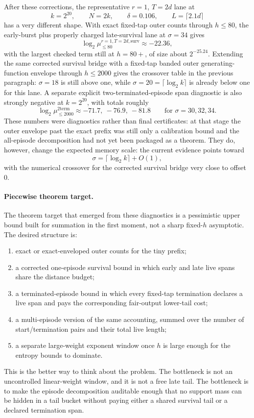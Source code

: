 After these corrections, the representative \(r=1\), \(T=2d\) lane at
\[
k=2^{20},\qquad N=2k,\qquad \delta=0.106,\qquad L=\lceil2.1d\rceil
\]
has a very different shape.  With exact fixed-tap outer counts through \(h\le80\), the early-burst plus properly
charged late-survival lane at \(\sigma=34\) gives
\[
\log_2 \mu_{\le80}^{r=1,T=2d,\mathrm{surv}}\approx -22.36,
\]
with the largest checked term still at \(h=80+\), of size about \(2^{-25.24}\).  Extending the same corrected survival
bridge with a fixed-tap banded outer generating-function envelope through \(h\le2000\) gives the crossover table in the
previous paragraph: \(\sigma=18\) is still above one, while \(\sigma=20=\lceil\log_2 k\rceil\) is already below one for
this lane.  A separate explicit two-terminated-episode span diagnostic is also strongly negative at
\(k=2^{20}\), with totals roughly
\[
\log_2\mu^{\mathrm{2term}}_{\le2000}
\approx -71.7,\ -76.9,\ -81.8
\qquad
\text{for }\sigma=30,32,34.
\]
These numbers were diagnostics rather than final certificates: at that stage the outer envelope past the exact prefix
was still only a calibration bound and the all-episode decomposition had not yet been packaged as a theorem.  They do,
however, change the expected memory scale: the current evidence points toward
\[
\sigma=\lceil\log_2 k\rceil+O(1),
\]
with the numerical crossover for the corrected survival bridge very close to offset \(0\).

\paragraph{Piecewise theorem target.}
The theorem target that emerged from these diagnostics is a pessimistic upper bound built for summation in the first
moment, not a sharp fixed-\(h\) asymptotic.  The desired structure is:
\begin{enumerate}
\item exact or exact-enveloped outer counts for the tiny prefix;
\item a corrected one-episode survival bound in which early and late live spans share the distance budget;
\item a terminated-episode bound in which every fixed-tap termination declares a live span and pays the corresponding
fair-output lower-tail cost;
\item a multi-episode version of the same accounting, summed over the number of start/termination pairs and their
total live length;
\item a separate large-weight exponent window once \(h\) is large enough for the entropy bounds to dominate.
\end{enumerate}
This is the better way to think about the problem.  The bottleneck is not an uncontrolled linear-weight window, and it
is not a free late tail.  The bottleneck is to make the episode decomposition auditable enough that no support mass can
be hidden in a tail bucket without paying either a shared survival tail or a declared termination span.

